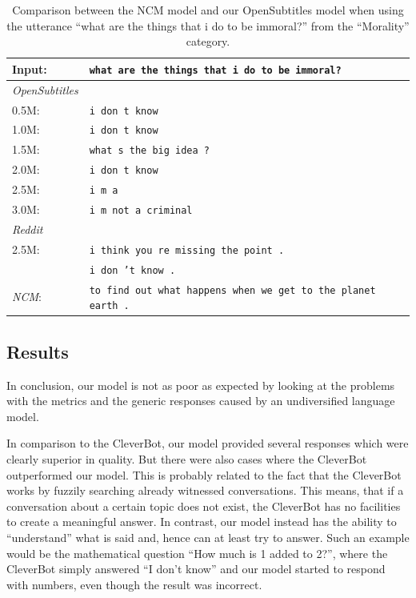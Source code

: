 \begin{table}[H]
	\centering
	\begin{adjustbox}{max width=\textwidth}
		\begin{tabularx}{\textwidth}{lX}
			\toprule
			Input: 	& \texttt{what are the things that i do to be immoral?}\\
			\midrule
			\emph{OpenSubtitles}\\
			0.5M: 	& \texttt{i don t know}\\
			1.0M: 	& \texttt{i don t know}\\
			1.5M:	& \texttt{what s the big idea ?}\\
			2.0M:	& \texttt{i don t know}\\
			2.5M:	& \texttt{i m a}\\
			3.0M:	& \texttt{i m not a criminal}\\
			\midrule
			\emph{Reddit}\\
			2.5M:	& \texttt{i think you re missing the point .}\\
			& \texttt{i don ’t know .}\\
			\midrule
			\emph{NCM}:	& \texttt{to find out what happens when we get to the planet earth .}\\
			\bottomrule
		\end{tabularx}
	\end{adjustbox}
	\caption{Comparison between the NCM model and our OpenSubtitles model when using the utterance ``what are the things that i do to be immoral?'' from the ``Morality'' category.}
	\label{results:example14_output:Neural_Conversational_Model_compared}
\end{table}

\subsection{Results}
In conclusion, our model is not as poor as expected by looking at the problems with the metrics and the generic responses caused by an undiversified language model.

In comparison to the CleverBot, our model provided several responses which were clearly superior in quality. But there were also cases where the CleverBot outperformed our model. This is probably related to the fact that the CleverBot works by fuzzily searching already witnessed conversations. This means, that if a conversation about a certain topic does not exist, the CleverBot has no facilities to create a meaningful answer. In contrast, our model instead has the ability to ``understand'' what is said and, hence can at least try to answer. Such an example would be the mathematical question ``How much is 1 added to 2?'', where the CleverBot simply answered ``I don't know'' and our model started to respond with numbers, even though the result was incorrect.

